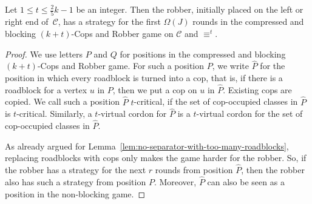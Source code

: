 \documentclass[a4paper,english, thm-restate]{lipics-v2021}
\newcommand{\comp}{\equiv}
\newcommand{\grid}{\mathcal{C}}
\begin{document}
\begin{lemma}
	Let $1\leq t \leq \frac{2}{5}k -1$ be an integer.
	Then the robber, initially placed on the left or right end of~$\grid$,
	has a strategy for the first $\Omega(J)$
	rounds in the compressed and blocking $(k+t)$-Cops and Robber game
	on $\grid$ and $\comp^t$.
\end{lemma}
%
\begin{proof}
We use letters $P$ and $Q$ for positions in the compressed and blocking $(k+t)$-Cops and Robber game.
	For such a position $P$, we write $\hat{P}$ for the position
	in which every roadblock is turned into a cop,
	that is, if there is a roadblock for a vertex $u$ in $P$,
	then we put a cop on $u$ in $\hat{P}$.
	Existing cops are copied.
	We call such a position $\hat{P}$ $t$-critical,
	if the set of cop-occupied classes in $\hat{P}$ is $t$-critical.
	Similarly, a $t$-virtual cordon for $\hat{P}$
	is a $t$-virtual cordon for the set of cop-occupied classes in $\hat{P}$.
	
	As already argued for Lemma~\ref{lem:no-separator-with-too-many-roadblocks},
	replacing roadblocks with cops only makes the game  harder for the robber.
	So, if the robber has a strategy for the next $r$ rounds from position $\hat{P}$,
	then the robber also has such a strategy from position $P$.
	Moreover, $\hat{P}$ can also be seen as a position
	in the non-blocking game.
	

\end{proof}
\end{document}
